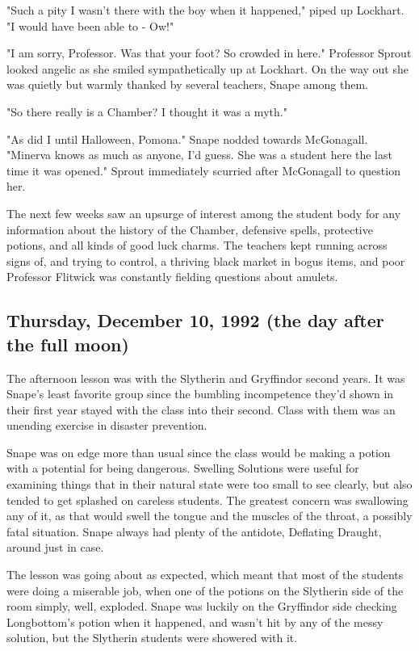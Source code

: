 "Such a pity I wasn't there with the boy when it happened," piped up Lockhart. "I would have been able to - Ow!"

"I am sorry, Professor. Was that your foot? So crowded in here." Professor Sprout looked angelic as she smiled sympathetically up at Lockhart. On the way out she was quietly but warmly thanked by several teachers, Snape among them.

"So there really is a Chamber? I thought it was a myth."

"As did I until Halloween, Pomona." Snape nodded towards McGonagall. "Minerva knows as much as anyone, I'd guess. She was a student here the last time it was opened." Sprout immediately scurried after McGonagall to question her.

The next few weeks saw an upsurge of interest among the student body for any information about the history of the Chamber, defensive spells, protective potions, and all kinds of good luck charms. The teachers kept running across signs of, and trying to control, a thriving black market in bogus items, and poor Professor Flitwick was constantly fielding questions about amulets.

\sbreak

\subsection{Thursday, December 10, 1992 (the day after the full moon)}

The afternoon lesson was with the Slytherin and Gryffindor second years. It was Snape's least favorite group since the bumbling incompetence they'd shown in their first year stayed with the class into their second. Class with them was an unending exercise in disaster prevention.

Snape was on edge more than usual since the class would be making a potion with a potential for being dangerous. Swelling Solutions were useful for examining things that in their natural state were too small to see clearly, but also tended to get splashed on careless students. The greatest concern was swallowing any of it, as that would swell the tongue and the muscles of the throat, a possibly fatal situation. Snape always had plenty of the antidote, Deflating Draught, around just in case.

The lesson was going about as expected, which meant that most of the students were doing a miserable job, when one of the potions on the Slytherin side of the room simply, well, exploded. Snape was luckily on the Gryffindor side checking Longbottom's potion when it happened, and wasn't hit by any of the messy solution, but the Slytherin students were showered with it.

